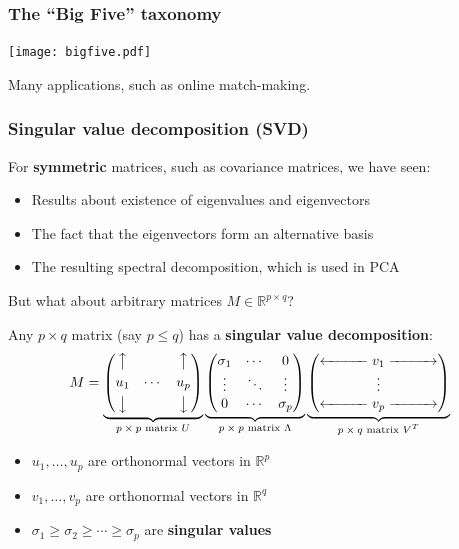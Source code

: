 \documentclass[smaller]{beamer}
\def\R{{\mathbb R}}
\def\darkred{\color{red!70!black}}
\def\darkgreen{\color{green!60!black}}
\def\v2{{\vskip.2in}}
\def\R{{\mathbb R}}
\begin{document}
\begin{frame}
\frametitle{The ``Big Five'' taxonomy}

\texttt{[image: bigfive.pdf]}

\pause\v2
\alert{Many applications, such as online match-making.}

\end{frame}

\begin{frame}
\frametitle{Singular value decomposition (SVD)}

For {\bf symmetric} matrices, such as covariance matrices, we have seen:
\begin{itemize}
\item Results about existence of eigenvalues and eigenvectors
\item The fact that the eigenvectors form an alternative basis
\item The resulting spectral decomposition, which is used in PCA
\end{itemize}
But what about arbitrary matrices $M \in \R^{p \times q}$? 

\pause\v2
\alert{Any $p \times q$ matrix (say $p \leq q$) has a {\bf singular value decomposition}:}
{\darkred 
$$
M = 
\underbrace{\begin{pmatrix}
\big\uparrow    &         & \big\uparrow \\[.05in]
u_1             &  \cdots  & u_p  \\[.05in]
\big\downarrow  &         & \big\downarrow
\end{pmatrix}}_{\text{$p \times p$ matrix $U$}}
\underbrace{\begin{pmatrix}
\sigma_1  & \cdots & 0       \\
\vdots    & \ddots & \vdots  \\
0         & \cdots & \sigma_p            
\end{pmatrix}}_{\text{$p \times p$ matrix $\Lambda$}}
\underbrace{\begin{pmatrix} 
\xleftarrow{\hspace*{1cm}} v_1 \xrightarrow{\hspace*{1cm}} \\
\vdots \\
\xleftarrow{\hspace*{1cm}} v_p \xrightarrow{\hspace*{1cm}} 
\end{pmatrix}}_{\text{$p\times q$ matrix $V^T$}}
$$}
\begin{itemize}
\item {\darkgreen $u_1, \ldots, u_p$ are orthonormal vectors in $\R^p$}
\item {\darkgreen $v_1, \ldots, v_p$ are orthonormal vectors in $\R^q$}
\item {\darkgreen $\sigma_1 \geq \sigma_2 \geq \cdots \geq \sigma_p$ are {\bf singular values}}
\end{itemize}

\end{frame}
\end{document}
